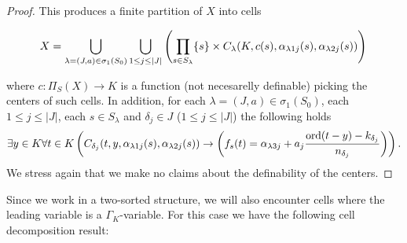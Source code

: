 \begin{proof}
This produces a finite partition of $X$ into cells

\[X = \bigcup_{\lambda=(J,a)\in \sigma_1(S_0)}\bigcup_{1\leq j\leq |J|}\left( \prod_{s\in S_\lambda} \{s\}\times C_{\lambda}(K,c(s),\alpha_{\lambda 1j}(s),\alpha_{\lambda 2j}(s))\right)\\
\]

where $c:\Pi_S(X)\to K$  is a function (not necesarelly definable) picking the centers of such cells. In addition, for each $\lambda=(J,a)\in \sigma_1(S_0)$, each $1\leq j\leq |J|$, each $s\in S_\lambda$ and $\delta_j\in J$ ($1\leq j\leq|J|$) the following holds \small
\[\exists y\in K\forall t\in K \left(C_{\delta_j}(t,y,\alpha_{\lambda 1j}(s),\alpha_{\lambda 2j}(s)) \rightarrow \left(f_s(t)=\alpha_{\lambda 3j}+a_j\frac{\operatorname{ord}(t-y)-k_{\delta_j}}{n_{\delta_j}}\right)\right).
\]
\normalsize
We stress again that we make no claims about the definability of the centers. 
\end{proof}




Since we work in a two-sorted structure, we will also encounter cells where the leading variable is a $\Gamma_K$-variable. For this case we have the following cell decomposition result:

